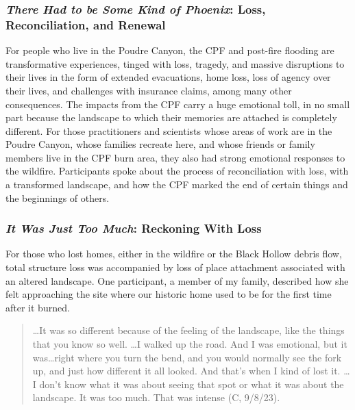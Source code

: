 \documentclass[
]{article}
\begin{document}
\subsubsection{\texorpdfstring{\emph{There Had to be Some Kind of Phoenix}: Loss, Reconciliation, and Renewal}{There Had to be Some Kind of Phoenix: Loss, Reconciliation, and Renewal}}\label{there-had-to-be-some-kind-of-phoenix-loss-reconciliation-and-renewal}

For people who live in the Poudre Canyon, the CPF and post-fire flooding are transformative experiences, tinged with loss, tragedy, and massive disruptions to their lives in the form of extended evacuations, home loss, loss of agency over their lives, and challenges with insurance claims, among many other consequences. The impacts from the CPF carry a huge emotional toll, in no small part because the landscape to which their memories are attached is completely different. For those practitioners and scientists whose areas of work are in the Poudre Canyon, whose families recreate here, and whose friends or family members live in the CPF burn area, they also had strong emotional responses to the wildfire. Participants spoke about the process of reconciliation with loss, with a transformed landscape, and how the CPF marked the end of certain things and the beginnings of others.

\subsubsection{\texorpdfstring{\emph{It Was Just Too Much}: Reckoning With Loss}{It Was Just Too Much: Reckoning With Loss}}\label{it-was-just-too-much-reckoning-with-loss}

For those who lost homes, either in the wildfire or the Black Hollow debris flow, total structure loss was accompanied by loss of place attachment associated with an altered landscape. One participant, a member of my family, described how she felt approaching the site where our historic home used to be for the first time after it burned.

\begin{quote}
\ldots It was so different because of the feeling of the landscape, like the things that you know so well. \ldots I walked up the road. And I was emotional, but it was\ldots right where you turn the bend, and you would normally see the fork up, and just how different it all looked. And that's when I kind of lost it. \ldots I don't know what it was about seeing that spot or what it was about the landscape. It was too much. That was intense (C, 9/8/23).
\end{quote}
\end{document}
